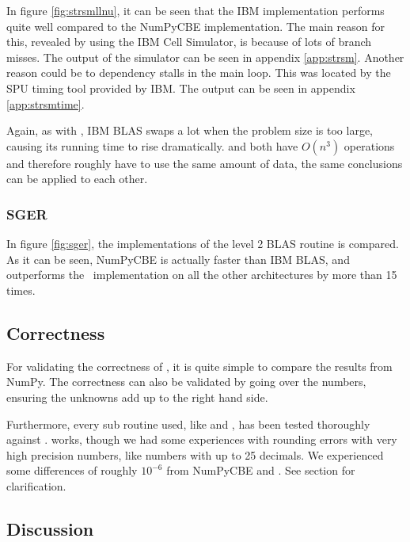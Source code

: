 In figure \ref{fig:strsmllnu}, it can be seen that the IBM
implementation performs quite well compared to the NumPyCBE
implementation. The main reason for this, revealed by using the IBM
Cell Simulator, is because of lots of branch misses. The output of the
simulator can be seen in appendix \ref{app:strsm}. Another reason
could be to dependency stalls in the main loop. This was located by
the SPU timing tool provided by IBM. The output can be seen in
appendix \ref{app:strsmtime}.

Again, as with , IBM BLAS swaps a lot when the problem
size is too large, causing its running time to rise
dramatically.  and  both have $O(n^3)$
operations and therefore roughly have to use the same amount of data,
the same conclusions can be applied to each other.



\subsubsection{SGER}

In figure \ref{fig:sger}, the implementations of the level 2 BLAS
routine  is compared. As it can be seen, NumPyCBE is
actually faster than IBM BLAS, and outperforms the \ATLAS\
implementation on all the other architectures by more than 15 times.


\subsection{Correctness}

For validating the correctness of , it is quite simple
to compare the results from NumPy. The correctness can also be
validated by going over the numbers, ensuring the unknowns add up to the
right hand side.


Furthermore, every sub routine used, like 
and , has been tested thoroughly
against \ATLAS{}.  works, though we had some
experiences with rounding errors with very high precision numbers,
like numbers with up to 25 decimals. We experienced some differences
of roughly $10^{-6}$ from NumPyCBE and \ATLAS{}. See
section  for clarification.

\subsection{Discussion}

